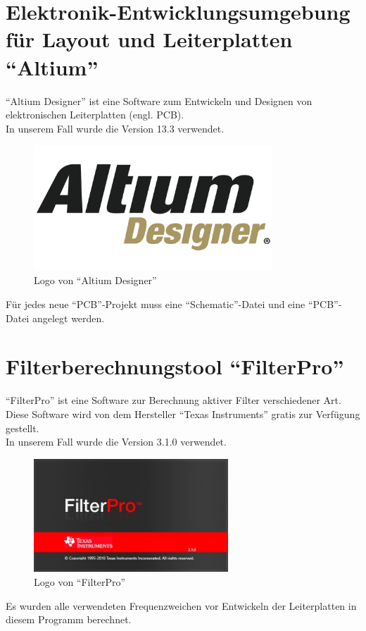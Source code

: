 \section{Elektronik-Entwicklungsumgebung für Layout und Leiterplatten \enquote{Altium}} \label{sec:6.1}
\enquote{Altium Designer} ist eine Software zum Entwickeln und Designen von elektronischen Leiterplatten (engl. PCB).\\
In unserem Fall wurde die Version 13.3 verwendet. 
\begin{figure} [H]
	\centering
	\includegraphics[width=0.8\textwidth]{img/Grundlagen/Altium/ad_logo.png}
	\caption[Logo von \enquote{Altium Designer}]{Logo von \enquote{Altium Designer}\footnotemark}
	\label{fig:6.1.1}
\end{figure}
Für jedes neue \enquote{PCB}-Projekt muss eine \enquote{Schematic}-Datei und eine \enquote{PCB}-Datei angelegt werden.

\newpage
\section{Filterberechnungstool \enquote{FilterPro}}\label{sec:6.2}
\enquote{FilterPro} ist eine Software zur Berechnung aktiver Filter verschiedener Art.
Diese Software wird von dem Hersteller \enquote{Texas Instruments} gratis zur Verfügung gestellt.\\
In unserem Fall wurde die Version 3.1.0 verwendet. 
\begin{figure} [H]
	\centering
	\includegraphics[width=0.65\textwidth]{img/VerwendeteTools/FilterPro.jpg}
	\caption[Logo von \enquote{FilterPro}]{Logo von \enquote{FilterPro}}
	\label{fig:6.2.1}
\end{figure}
Es wurden alle verwendeten Frequenzweichen vor Entwickeln der Leiterplatten in diesem Programm berechnet.
